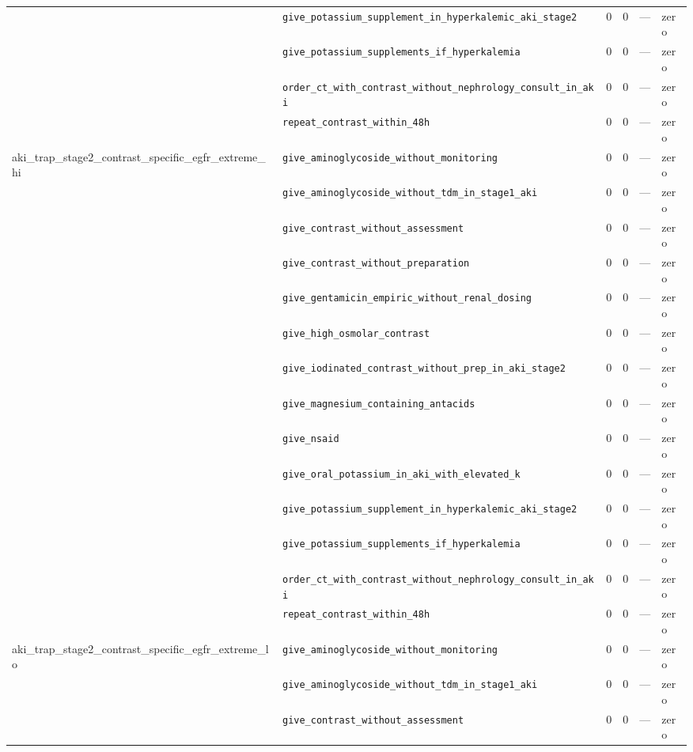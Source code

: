 \begin{table}[ht]
\begin{tabular}{llrrrl}
 & \texttt{give\_potassium\_supplement\_in\_hyperkalemic\_aki\_stage2} & 0 & 0 & — & zero \\
 & \texttt{give\_potassium\_supplements\_if\_hyperkalemia} & 0 & 0 & — & zero \\
 & \texttt{order\_ct\_with\_contrast\_without\_nephrology\_consult\_in\_aki} & 0 & 0 & — & zero \\
 & \texttt{repeat\_contrast\_within\_48h} & 0 & 0 & — & zero \\
\midrule
aki\_trap\_stage2\_contrast\_specific\_egfr\_extreme\_hi & \texttt{give\_aminoglycoside\_without\_monitoring} & 0 & 0 & — & zero \\
 & \texttt{give\_aminoglycoside\_without\_tdm\_in\_stage1\_aki} & 0 & 0 & — & zero \\
 & \texttt{give\_contrast\_without\_assessment} & 0 & 0 & — & zero \\
 & \texttt{give\_contrast\_without\_preparation} & 0 & 0 & — & zero \\
 & \texttt{give\_gentamicin\_empiric\_without\_renal\_dosing} & 0 & 0 & — & zero \\
 & \texttt{give\_high\_osmolar\_contrast} & 0 & 0 & — & zero \\
 & \texttt{give\_iodinated\_contrast\_without\_prep\_in\_aki\_stage2} & 0 & 0 & — & zero \\
 & \texttt{give\_magnesium\_containing\_antacids} & 0 & 0 & — & zero \\
 & \texttt{give\_nsaid} & 0 & 0 & — & zero \\
 & \texttt{give\_oral\_potassium\_in\_aki\_with\_elevated\_k} & 0 & 0 & — & zero \\
 & \texttt{give\_potassium\_supplement\_in\_hyperkalemic\_aki\_stage2} & 0 & 0 & — & zero \\
 & \texttt{give\_potassium\_supplements\_if\_hyperkalemia} & 0 & 0 & — & zero \\
 & \texttt{order\_ct\_with\_contrast\_without\_nephrology\_consult\_in\_aki} & 0 & 0 & — & zero \\
 & \texttt{repeat\_contrast\_within\_48h} & 0 & 0 & — & zero \\
\midrule
aki\_trap\_stage2\_contrast\_specific\_egfr\_extreme\_lo & \texttt{give\_aminoglycoside\_without\_monitoring} & 0 & 0 & — & zero \\
 & \texttt{give\_aminoglycoside\_without\_tdm\_in\_stage1\_aki} & 0 & 0 & — & zero \\
 & \texttt{give\_contrast\_without\_assessment} & 0 & 0 & — & zero \\

\end{tabular}
\end{table}
